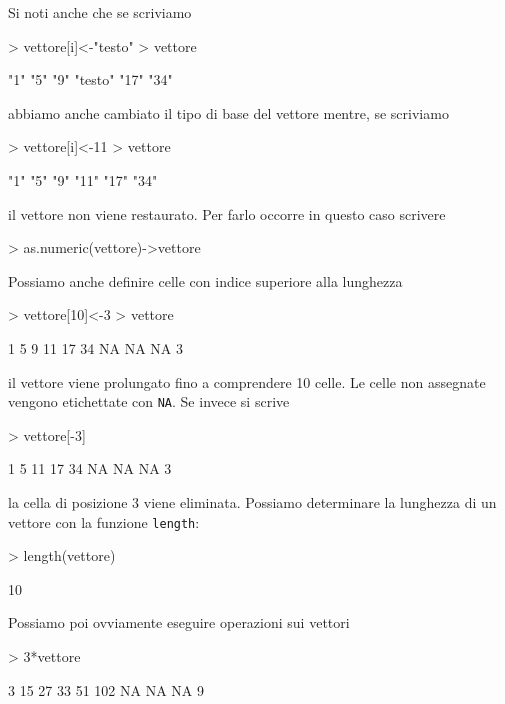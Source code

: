 \documentclass[onecolumn,11pt]{book}
\begin{document}
Si noti anche che se scriviamo
\begin{Schunk}
\begin{Sinput}
> vettore[i]<-"testo"
> vettore
\end{Sinput}
\begin{Soutput}
[1] "1"     "5"     "9"     "testo" "17"    "34"   
\end{Soutput}
\end{Schunk}
abbiamo anche cambiato il tipo di base del vettore mentre, se scriviamo
\begin{Schunk}
\begin{Sinput}
> vettore[i]<-11
> vettore
\end{Sinput}
\begin{Soutput}
[1] "1"  "5"  "9"  "11" "17" "34"
\end{Soutput}
\end{Schunk}
il vettore non viene restaurato. Per farlo occorre in questo caso scrivere
\begin{Schunk}
\begin{Sinput}
> as.numeric(vettore)->vettore 
\end{Sinput}
\end{Schunk}
Possiamo anche definire celle con indice superiore alla lunghezza
\begin{Schunk}
\begin{Sinput}
> vettore[10]<-3
> vettore
\end{Sinput}
\begin{Soutput}
 [1]  1  5  9 11 17 34 NA NA NA  3
\end{Soutput}
\end{Schunk}
 il vettore viene prolungato fino a comprendere 10 celle. Le celle non assegnate vengono etichettate con \texttt{NA}.
 Se invece si scrive
\begin{Schunk}
\begin{Sinput}
> vettore[-3]
\end{Sinput}
\begin{Soutput}
[1]  1  5 11 17 34 NA NA NA  3
\end{Soutput}
\end{Schunk}
la cella di posizione 3 viene eliminata.
Possiamo determinare la lunghezza di un vettore con la funzione \texttt{length}:
\begin{Schunk}
\begin{Sinput}
> length(vettore)
\end{Sinput}
\begin{Soutput}
[1] 10
\end{Soutput}
\end{Schunk}
 Possiamo poi ovviamente eseguire operazioni sui vettori
\begin{Schunk}
\begin{Sinput}
> 3*vettore
\end{Sinput}
\begin{Soutput}
 [1]   3  15  27  33  51 102  NA  NA  NA   9
\end{Soutput}
\end{Schunk}
 
\end{document}
